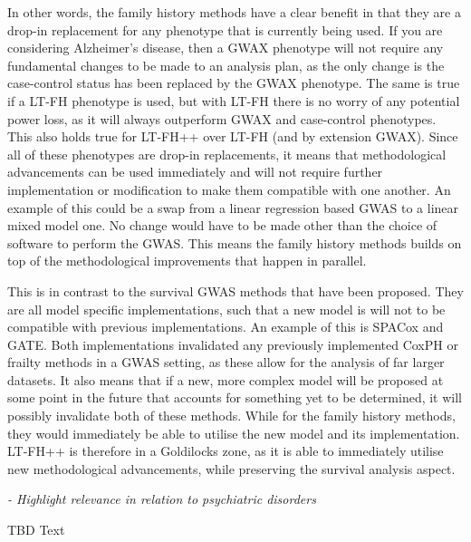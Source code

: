 In other words, the family history methods have a clear benefit in that they are a drop-in replacement for any phenotype that is 
currently being used. If you are considering Alzheimer's disease, then a GWAX phenotype will not require any fundamental changes to be 
made to an analysis plan, as the only change is the case-control status has been replaced by the GWAX phenotype. The same is true if a 
LT-FH phenotype is used, but with LT-FH there is no worry of any potential power loss, as it will always outperform GWAX and 
case-control phenotypes. This also holds true for LT-FH++ over LT-FH (and by extension GWAX). Since all of these phenotypes are 
drop-in replacements, it means that methodological advancements can be used immediately and will not require further implementation or 
modification to make them compatible with one another. An example of this could be a swap from a linear regression based GWAS to a 
linear mixed model one. No change would have to be made other than the choice of software to perform the GWAS. This means the family 
history methods builds on top of the methodological improvements that happen in parallel.

This is in contrast to the survival GWAS methods that have been proposed. They are all model specific implementations, such that a new 
model is will not to be compatible with previous implementations. An example of this is SPACox and GATE. Both implementations 
invalidated any previously implemented CoxPH or frailty methods in a GWAS setting, as these allow for the analysis of far larger 
datasets. It also means that if a new, more complex model will be proposed at some point in the future that accounts for something yet 
to be determined, it will possibly invalidate both of these methods. While for the family history methods, they would immediately be 
able to utilise the new model and its implementation. LT-FH++ is therefore in a Goldilocks zone, as it is able to immediately utilise 
new methodological advancements, while preserving the survival analysis aspect.    


{\itshape
- Highlight relevance in relation to psychiatric disorders
}

TBD Text


